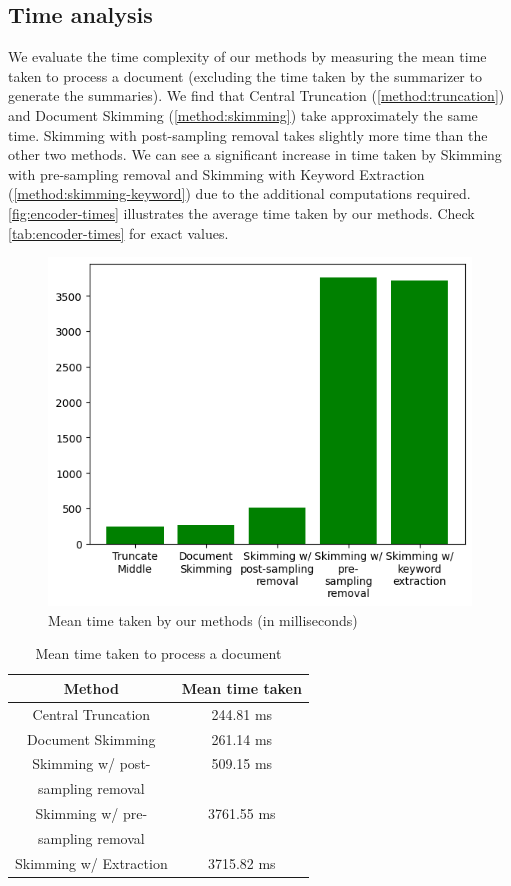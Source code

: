 \subsection*{Time analysis}

We evaluate the time complexity of our methods by measuring the mean time taken to process a
document (excluding the time taken by the summarizer to generate the summaries).
We find that Central Truncation (\ref{method:truncation}) and Document Skimming
(\ref{method:skimming}) take approximately the same time.
Skimming with post-sampling removal takes slightly more time than the other two methods.
We can see a significant increase in time taken by Skimming with pre-sampling removal and Skimming
with Keyword Extraction (\ref{method:skimming-keyword}) due to the additional computations required.
\autoref{fig:encoder-times} illustrates the average time taken by our methods.
Check \autoref{tab:encoder-times} for exact values.

\begin{figure}[!ht]
	\centering
	\includegraphics[width=.48\textwidth]{Images/encoder-times.png}
	\caption{Mean time taken by our methods (in milliseconds)}
	\label{fig:encoder-times}
\end{figure}

\begin{table}[!ht]
	\centering

	\begin{tabular}{c c}
		\hline
		Method & Mean time taken \\
		\hline
		Central Truncation & 244.81 ms \\
		Document Skimming & 261.14 ms \\
		Skimming w/ post- & 509.15 ms \\
		sampling removal & \\
		Skimming w/ pre- & 3761.55 ms \\
		sampling removal & \\
		Skimming w/ Extraction & 3715.82 ms \\
		\hline
	\end{tabular}

	\caption{Mean time taken to process a document}
	\label{tab:encoder-times}
\end{table}
